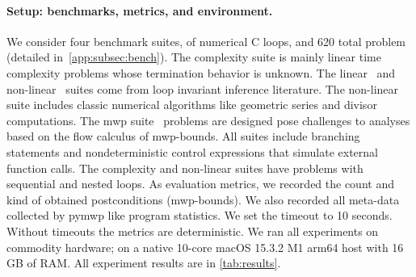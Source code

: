 \paragraph*{Setup: benchmarks, metrics, and environment.}\label{subsec:exp-setup}
We consider four benchmark suites, of numerical C loops, and 620 total problem (detailed in~\autoref{app:subsec:bench}).
The {complexity} suite is mainly linear time complexity problems whose termination behavior is unknown.
The {linear}~\cite{si2018} and {non-linear}~\cite{nguyen2017,yu2023} suites come from loop invariant inference literature.
The non-linear suite includes classic numerical algorithms like geometric series and divisor computations.
The {mwp} suite~\cite{aubert2023b} problems are designed pose challenges to analyses based on the flow calculus of mwp-bounds.
All suites include branching statements and nondeterministic control expressions that simulate external function calls.
The complexity and non-linear suites have problems with sequential and nested loops.
As evaluation metrics, we recorded the count and kind of obtained postconditions (\ie mwp-bounds).
We also recorded all meta-data collected by pymwp like program statistics.
We set the timeout to 10 seconds.
Without timeouts the metrics are deterministic.
We ran all experiments on commodity hardware;
on a native 10-core macOS 15.3.2 M1 arm64 host with 16 GB of RAM\@.
All experiment results are in \autoref{tab:results}.

